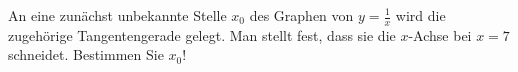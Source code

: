 \item An eine zunächst unbekannte Stelle $x_0$ des Graphen von $y=\frac{1}{x}$ wird die zugehörige
Tangentengerade gelegt. Man stellt fest, dass sie die $x$-Achse bei $x=7$ schneidet. Bestimmen
Sie $x_0$!
